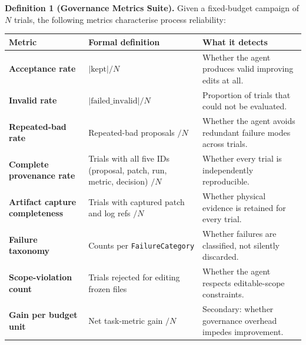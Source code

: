 \textbf{Definition 1 (Governance Metrics Suite).} Given a fixed-budget campaign of \(N\) trials, the following metrics characterise process reliability:

\begin{table}[t]
\small
\begin{tabular}{@{}
  >{\raggedright\arraybackslash}p{}
  >{\raggedright\arraybackslash}p{}
  >{\raggedright\arraybackslash}p{}@{}}
\toprule
\begin{minipage}[b]{\linewidth}\raggedright
Metric
\end{minipage} & \begin{minipage}[b]{\linewidth}\raggedright
Formal definition
\end{minipage} & \begin{minipage}[b]{\linewidth}\raggedright
What it detects
\end{minipage} \\
\midrule
\bottomrule
\textbf{Acceptance rate} & \(\lvert\text{kept}\rvert / N\) & Whether the agent produces valid improving edits at all. \\
\textbf{Invalid rate} & \(\lvert\text{failed\_invalid}\rvert / N\) & Proportion of trials that could not be evaluated. \\
\textbf{Repeated-bad rate} & Repeated-bad proposals \(/ N\) & Whether the agent avoids redundant failure modes across trials. \\
\textbf{Complete provenance rate} & Trials with all five IDs (proposal, patch, run, metric, decision) \(/ N\) & Whether every trial is independently reproducible. \\
\textbf{Artifact capture completeness} & Trials with captured patch and log refs \(/ N\) & Whether physical evidence is retained for every trial. \\
\textbf{Failure taxonomy} & Counts per \passthrough{\lstinline!FailureCategory!} & Whether failures are classified, not silently discarded. \\
\textbf{Scope-violation count} & Trials rejected for editing frozen files & Whether the agent respects editable-scope constraints. \\
\textbf{Gain per budget unit} & Net task-metric gain \(/ N\) & Secondary: whether governance overhead impedes improvement. \\
\end{tabular}
\end{table}

